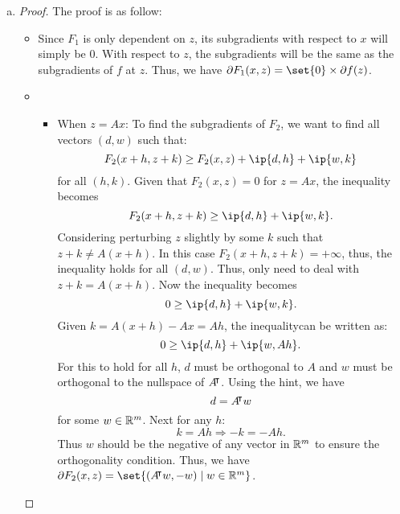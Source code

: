 \documentclass{article}
\begin{document}
\begin{solution}
\begin{enumerate}[(a)]
{\begin{proof}
\begin{itemize}
                    \item \textbf{\( F \) is convex:}
                    \( F \) is the sum of \( F_1 \) and \( F_2 \), and the sum of two convex functions is also convex.

                    \item \textbf{\( d \in \partial g(x) \) implies \( (d, 0) \in \partial F(x, Ax) \):}
                    By the definition of subgradients and function \( g \), we have:
                    \[ g(x+h) \geq g(x) + d^\top h \text{ for all } h \in \mathbb{R}^n. \]
                    Given \( g(x) = f(Ax) \), this can be rewritten as:
                    \[ f(A(x+h)) \geq f(Ax) + d^\top h. \]
                    Considering the definition of \( F \), we can express this inequality as:
                    \[ F(x+h, A(x+h)) \geq F(x, Ax) + d^\top h. \]
                    Given the definition of the subgradients for functions of two variables, this means:
                    \[ (d, 0) \in \partial F(x, Ax) \]
                \end{itemize}
            \end{proof}
        }
        \item {
            \begin{proof}
                The proof is as follow:
                \begin{itemize}
                    \item Since $F_1$ is only dependent on $z$, its subgradients with respect to $x$ will simply be $0$. With respect to $z$, the subgradients will be the same as the subgradients of $f$ at $z$. Thus, we have $\partial F_1(x,z)=\set{0}\times\partial f(z)$.
                    \item {
                        \begin{itemize}
                            \item When $z=Ax$: To find the subgradients of $F_2$, we want to find all vectors $(d,w)$ such that: \[F_2(x+h,z+k)\geq F_2(x,z)+\ip{d,h}+\ip{w,k}\] for all $(h,k)$. Given that $F_2(x,z)=0$ for $z=Ax$, the inequality becomes \[F_2(x+h,z+k)\geq \ip{d,h}+\ip{w,k}.\] Considering perturbing $z$ slightly by some $k$ such that $z+k\neq A(x+h)$. In this case $F_2(x+h,z+k)=+\infty$, thus, the inequality holds for all $(d,w)$. Thus, only need to deal with $z+k = A(x+h)$. Now the inequality becomes \[0\geq \ip{d,h}+\ip{w,k}.\] Given $k=A(x+h)-Ax=Ah$, the inequalitycan be written as: \[0\geq \ip{d,h}+\ip{w,Ah}.\] For this to hold for all $h$, $d$ must be orthogonal to $A$ and $w$ must be orthogonal to the nullspace of $A{}^{\mkern-4mu\intercal}$. Using the hint, we have \[d=A{}^{\mkern-4mu\intercal} w\] for some $w\in\mathbb{R}^m$. Next for any $h$: \[k=Ah\Rightarrow -k=-Ah.\] Thus $w$ should be the negative of any vector in $\mathbb{R}^m$ to ensure the orthogonality condition. Thus, we have $\partial F_2(x,z)=\set{(A\trn w,-w)\mid w\in\R^m}$.

\end{itemize}}
\end{itemize}
\end{proof}}
\end{enumerate}
\end{solution}
\end{document}
